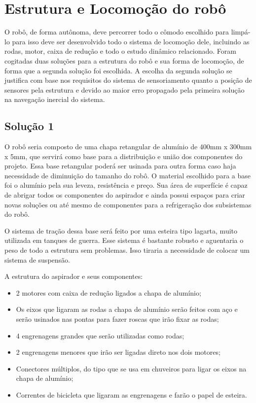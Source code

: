 \section{Estrutura e Locomoção do robô} %
\label{sub:locomocao}
	
	O robô, de forma autônoma, deve percorrer todo o cômodo escolhido para limpá-lo para isso deve ser desenvolvido todo o sistema de locomoção dele, incluindo as rodas, motor, caixa de redução e todo o estudo dinâmico relacionado. Foram cogitadas duas soluções para a estrutura do robô e sua forma de locomoção, de forma que a segunda solução foi escolhida. A escolha da segunda solução se justifica com base nos requisitos do sistema de sensoriamento quanto a posição de sensores pela estrutura e devido ao maior erro propagado pela primeira solução na navegação inercial do sistema. 

	\subsection{Solução 1} %
	\label{sub:solução_1}

		O robô seria composto de uma chapa retangular de alumínio de 400mm x 300mm x 5mm, que servirá como base para a distribuição e união dos componentes do projeto. Essa base retangular poderá ser usinada para outra forma caso haja necessidade de diminuição do tamanho do robô. O material escolhido para a base foi o alumínio pela sua leveza, resistência e preço. Sua área  de superfície é capaz de abrigar todos os componentes do aspirador e ainda possui espaços para criar novas soluções ou até mesmo de componentes para a refrigeração dos subsistemas do robô.

		O sistema de tração dessa base será feito por uma esteira tipo lagarta, muito utilizada em tanques de guerra. Esse sistema é bastante robusto e aguentaria o peso de todo a estrutura sem problemas. Isso tiraria a necessidade de colocar um sistema de suspensão.

		A estrutura do aspirador e seus componentes:

		\begin{itemize}
			\item 2 motores com caixa de redução ligados a chapa de alumínio;
			\item Os eixos que ligaram as rodas a chapa de alumínio serão feitos com aço e serão usinados nas pontas para fazer roscas que irão fixar as rodas;
			\item 4 engrenagens grandes que serão utilizadas como rodas;
			\item 2 engrenagens menores que irão ser ligadas direto nos dois motores;
			\item Conectores múltiplos, do tipo que se usa em chuveiros para ligar os eixos na chapa de alumínio;
			\item Correntes de bicicleta que ligaram as engrenagens e farão o papel de esteira.
		\end{itemize}

